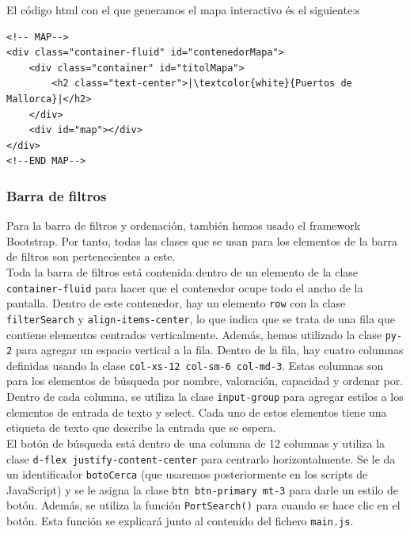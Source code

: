 \documentclass{article}
\begin{document}
\noindent El código html con el que generamos el mapa interactivo és el siguiente:s 
\begin{verbatim}
<!-- MAP-->
<div class="container-fluid" id="contenedorMapa">
    <div class="container" id="titolMapa">
        <h2 class="text-center">|\textcolor{white}{Puertos de Mallorca}|</h2>
    </div>
    <div id="map"></div>
</div>
<!--END MAP-->
\end{verbatim}

\subsubsection{Barra de filtros}
Para la barra de filtros y ordenación, también hemos usado el framework Bootstrap. Por tanto, todas las clases que se usan para los elementos de la barra de filtros son pertenecientes a este.\\

\noindent Toda la barra de filtros está contenida dentro de un elemento de la clase \texttt{container-fluid} para hacer que el contenedor ocupe todo el ancho de la pantalla. Dentro de este contenedor, hay un elemento \texttt{row} con la clase \texttt{filterSearch} y \texttt{align-items-center}, lo que indica que se trata de una fila que contiene elementos centrados verticalmente. Además, hemos utilizado la clase \texttt{py-2} para agregar un espacio vertical a la fila. Dentro de la fila, hay cuatro columnas definidas usando la clase \texttt{col-xs-12 col-sm-6 col-md-3}. Estas columnas son para los elementos de búsqueda por nombre, valoración, capacidad y ordenar por. Dentro de cada columna, se utiliza la clase \texttt{input-group} para agregar estilos a los elementos de entrada de texto y select. Cada uno de estos elementos tiene una etiqueta de texto que describe la entrada que se espera.\\

\noindent El botón de búsqueda está dentro de una columna de 12 columnas y utiliza la clase \texttt{d-flex justify-content-center} para centrarlo horizontalmente. Se le da un identificador \texttt{botoCerca} (que usaremos posteriormente en los scripts de JavaScript) y se le asigna la clase \texttt{btn btn-primary mt-3} para darle un estilo de botón. Además, se utiliza la función \texttt{PortSearch()} para cuando se hace clic en el botón. Esta función se explicará junto al contenido del fichero \texttt{main.js}.\\
\end{document}
